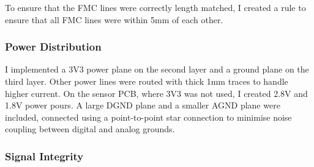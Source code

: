 \documentclass[10pt]{article}
\newcommand{\nl}{\newline \newline}
\begin{document}
To ensure that the FMC lines were correctly length matched, I created a rule to ensure that all FMC lines were within 5mm of each other.

\subsubsection{Power Distribution}
I implemented a 3V3 power plane on the second layer and a ground plane on the third layer. Other power lines were routed with thick 1mm traces to handle higher current.
\nl
On the sensor PCB, where 3V3 was not used, I created 2.8V and 1.8V power pours. A large DGND plane and a smaller AGND plane were included, connected using a point-to-point star connection to minimise noise coupling between digital and analog grounds.

\subsubsection{Signal Integrity}
\end{document}

